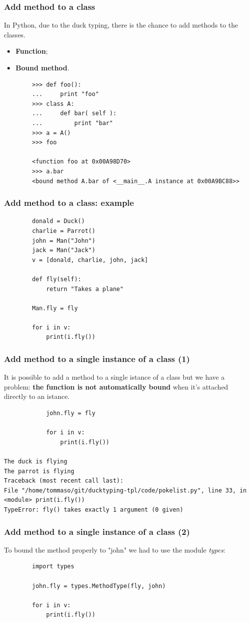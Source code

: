 \documentclass[xcolor ={table,usenames,dvipsnames}]{beamer}
\theoremstyle{definition}
\begin{document}
	\begin{frame}[fragile]
		\frametitle{Add method to a class}
			In Python, due to the duck typing, there is the chance to add methods to the classes. 
		\begin{itemize}
			\item \textbf{Function};
			\item \textbf{Bound method}.
		\end{itemize}
	
		\begin{lstlisting}
		>>> def foo():
		...     print "foo"
		>>> class A:
		...     def bar( self ):
		...         print "bar"
		>>> a = A()
		>>> foo
		
		<function foo at 0x00A98D70>
		>>> a.bar
		<bound method A.bar of <__main__.A instance at 0x00A9BC88>>
		\end{lstlisting}
	\end{frame}

	\begin{frame}[fragile]
		\frametitle{Add method to a class: example}
		\begin{lstlisting}
		donald = Duck()
		charlie = Parrot()
		john = Man("John")
		jack = Man("Jack")
		v = [donald, charlie, john, jack]
		
		def fly(self):
			return "Takes a plane"
		
		Man.fly = fly
		
		for i in v:
			print(i.fly())
		\end{lstlisting}
	\end{frame}

	\begin{frame}[fragile]
		\frametitle{Add method to a single instance of a class (1)}
			It is possible to add a method to a single istance of a class but we have a problem: \textbf{the function is not automatically bound} when it's attached directly to an istance.
			
				\begin{lstlisting}
			john.fly = fly
			
			for i in v:
				print(i.fly())
				
The duck is flying
The parrot is flying
Traceback (most recent call last):
File "/home/tommaso/git/ducktyping-tpl/code/pokelist.py", line 33, in <module> print(i.fly())
TypeError: fly() takes exactly 1 argument (0 given)
			\end{lstlisting}
	\end{frame}
	
	\begin{frame}[fragile]
		\frametitle{Add method to a single instance of a class (2)}
			
		To bound the method properly to "john" we had to use the module \textit{types}:
		
		\begin{lstlisting}
		import types
		
		john.fly = types.MethodType(fly, john)
		
		for i in v:
			print(i.fly())
		\end{lstlisting}
	\end{frame}
\end{document}
